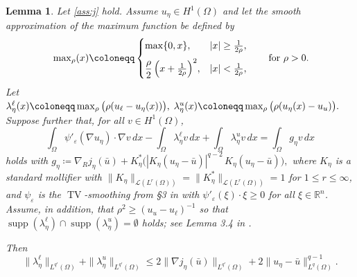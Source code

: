 \documentclass[11pt]{article}
\newcommand{\calL}{\mathcal{L}}
\newcommand{\maxrho}{\sideset{}{_\rho}{\max}}
\DeclareMathOperator*{\TV}{TV}
\DeclareMathOperator{\supp}{supp}
\newtheorem{lemma}[theorem]{Lemma}
\theoremstyle{definition}
\theoremstyle{remark}
\begin{document}
\begin{lemma}\label{Lq-mult}
Let \cref{ass:j} hold. Assume $u_\eta\in H^1(\Omega)$ and let  the smooth approximation of the maximum function be defined by
\[
\maxrho(x) \coloneqq
\begin{cases}
\max\{0,x\}, & |x|\ge \tfrac{1}{2\rho},\\[6pt]
\dfrac{\rho}{2}\,\Big(x + \tfrac{1}{2\rho}\Big)^2, & |x| < \tfrac{1}{2\rho},
\end{cases}
\qquad \text{for }\rho>0.
\]
Let
$ \lambda^\ell_\eta(x)\coloneqq\maxrho\big(\rho(u_\ell-u_\eta(x))\big),
\;
\lambda^u_\eta(x)
\coloneqq\maxrho\big(\rho(u_\eta(x)-u_u)\big).$ 
Suppose further that, for all $v\in H^1(\Omega)$,
%
\begin{equation}\label{VI-lemma}
\int_\Omega \psi'_\varepsilon(\nabla u_\eta)\cdot\nabla v\,d x
-\int_\Omega \lambda^\ell_\eta v\,dx
+\int_\Omega \lambda^u_\eta v\,dx
=\int_\Omega g_\eta v \,d x
\end{equation}
holds with
$
g_\eta \coloneqq \nabla_R j_\eta(\bar u)
+
K_\eta^*\big(|K_\eta(u_\eta-\bar u)|^{q-2}\,K_\eta(u_\eta-\bar u)\big),
$
where $K_\eta$ is a standard mollifier with
$\|K_\eta\|_{\calL(L^r(\Omega))}=\|K_\eta^*\|_{\calL(L^r(\Omega))}=1$
for $1\le r\le\infty$, and $\psi_\varepsilon$ is the $\TV$-smoothing
from \S3 in \cite{natemeyer2022penalty} with $\psi'_\varepsilon(\xi)\cdot\xi\ge 0$
for all $\xi\in\mathbb{R}^n$.
Assume, in addition, that $\rho^2\ge (u_u-u_\ell)^{-1}$ so that $\supp(\lambda^\ell_\eta)\cap\supp(\lambda^u_\eta)=\emptyset$
holds; see Lemma 3.4 in \cite{natemeyer2022penalty}.

Then
%
\[
\|\lambda^\ell_\eta\|_{L^{q'}(\Omega)}+\|\lambda^u_\eta\|_{L^{q'}(\Omega)}
\le 2\|\nabla j_\eta(\bar u)\|_{L^{q'}(\Omega)} + 2 \|u_\eta-\bar u\|_{L^{q}(\Omega)}^{q - 1}.
\]
%
\end{lemma}
\end{document}
